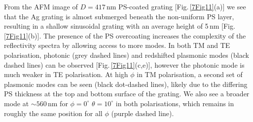 From the AFM image of $D=417$\,nm PS-coated grating [Fig.\,\ref{7Fig11}(a)] we see that the Ag grating is almost submerged beneath the non-uniform PS layer, resulting in a shallow sinusoidal grating with an average height of 5\,nm [Fig.\,\ref{7Fig11}(b)]. The presence of the PS overcoating increases the complexity of the reflectivity spectra by allowing access to more modes. In both TM and TE polarisation, photonic (grey dashed lines) and redshifted plasmonic modes (black dashed lines) can be observed [Fig.\,\ref{7Fig11}(c,e)], however the photonic mode is much weaker in TE polarisation. At high $\phi$ in TM polarisation, a second set of plasmonic modes can be seen (black dot-dashed lines), likely due to the differing PS thickness at the top and bottom surface of the grating. We also see a broader mode at $\sim560$\,nm for $\phi=0^{\circ}$ $\theta=10^{\circ}$ in both polarisations, which remains in roughly the same position for all $\phi$ (purple dashed line).

